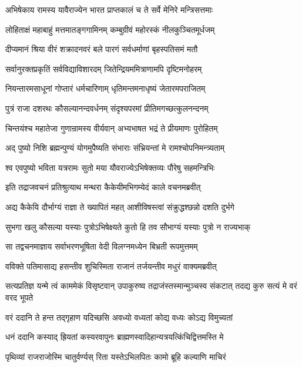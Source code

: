 \twolineshloka
{अभिषेकाय रामस्य यावैराज्येन भारत}
{प्राप्तकालं च ते सर्वे मेनिरे मन्त्रिसत्तमाः}


\twolineshloka
{लोहिताक्षं महाबाहुं मत्तमातङ्गगामिनम्}
{कम्बुग्रीवं महोरस्कं नीलकुञ्चितमूर्धजम्}


\twolineshloka
{दीप्यमानं श्रिया वीरं शक्रादनवरं बले}
{पारगं सर्वधर्माणां बृहस्पतिसमं मतौ}


\twolineshloka
{सर्वानुरक्तप्रकृतिं सर्वविद्याविशारदम्}
{जितेन्द्रियममित्राणामपि दृष्टिमनोहरम्}


\twolineshloka
{नियन्तारमसाधूनां गोप्तारं धर्मचारिणाम्}
{धृतिमन्तमनाधृष्यं जेतारमपराजितम्}


\twolineshloka
{पुत्रं राजा दशरथः कौसल्यानन्दवर्धनम्}
{संदृश्यपरमां प्रीतिमगच्छत्कुलनन्दनम्}


\twolineshloka
{चिन्तयंश्च महातेजा गुणान्रामस्य वीर्यवान्}
{अभ्यभाषत भद्रं ते प्रीयमाणः पुरोहितम्}


\twolineshloka
{अद् पुष्यो निशि ब्रह्मन्पुण्यं योगमुपैष्यति}
{संभाराः संभ्रियन्तां मे रामश्चोपनिमन्त्र्यताम्}


\twolineshloka
{श्व एवपुष्यो भविता यत्ररामः सुतो मया}
{यौवराज्येऽभिषेक्तव्यः पौरेषु सहमन्त्रिभिः}


\twolineshloka
{इति तद्राजवचनं प्रतिश्रुत्याथ मन्थरा}
{कैकेयीमभिगम्येदं काले वचनमब्रवीत्}


\twolineshloka
{अद्य कैकेयि दौर्भाग्यं राज्ञा ते ख्यापितं महत्}
{आशीविषस्त्वां संक्रुद्धश्छन्नो दशति दुर्भगे}


\twolineshloka
{सुभगा खलु कौसल्या यस्याः पुत्रोऽभिषेक्ष्यते}
{कुतो हि तव सौभाग्यं यस्याः पुत्रो न राज्यभाक्}


\twolineshloka
{सा तद्वचनमाज्ञाय सर्वाभरणभूषिता}
{वेदी विलग्नमध्येन बिभ्रती रूपमुत्तमम्}


\twolineshloka
{वविक्ते पतिमासाद्य हसन्तीव शुचिस्मिता}
{राजानं तर्जयन्तीव मधुरं वाक्यमब्रवीत्}


\threelineshloka
{सत्यप्रतिज्ञ यन्मे त्वं काममेकं विसृष्टवान्}
{उपाकुरुष्व तद्राजंस्तस्मान्मुञ्चस्व संकटात्}
{तदद्य कुरु सत्यं मे वरं वरद भूपते}



\twolineshloka
{वरं ददानि ते हन्त तद्गृहाण यदिच्छसि}
{अवध्यो वध्यतां कोद्य वध्यः कोऽद्य विमुच्यतां}


\twolineshloka
{धनं ददानि कस्याद् ह्रियतां कस्यरवापुनः}
{ब्राह्मणस्वादिहान्यत्रयत्किंचिद्वित्तमस्ति मे}


\twolineshloka
{पृथिव्यां राजराजोस्मि चातुर्वर्ण्यस् रिता}
{यस्तेऽभिलपितः कामो ब्रूहि कल्याणि माचिरं}


